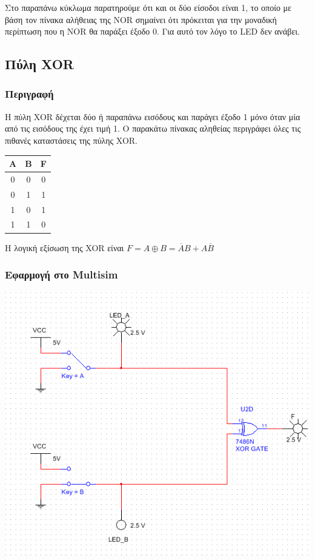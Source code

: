 \documentclass{article}
\begin{document}
Στο παραπάνω κύκλωμα παρατηρούμε ότι και οι δύο είσοδοι είναι 1, το οποίο με βάση
τον πίνακα αλήθειας της NOR σημαίνει ότι πρόκειται για την μοναδική περίπτωση που
η NOR θα παράξει έξοδο 0. Για αυτό τον λόγο το LED δεν ανάβει.

\subsection{Πύλη XOR}
\subsubsection{Περιγραφή}

H πύλη XOR δέχεται δύο ή παραπάνω εισόδους και παράγει έξοδο 1 μόνο όταν μία από τις
εισόδους της έχει τιμή 1. Ο παρακάτω πίνακας αληθείας περιγράφει όλες
τις πιθανές καταστάσεις της πύλης XOR.

\begin{center}
\begin{tabular}{|c|c|c|}
	\hline
	A & B & F \\
	\hline
	0 & 0 & 0 \\
	0 & 1 & 1 \\
	1 & 0 & 1 \\
	1 & 1 & 0 \\
	\hline
\end{tabular}
\end{center}

Η λογική εξίσωση της XOR είναι $F = A \oplus B = \overline{A}B + A\overline{B}$

\subsubsection{Εφαρμογή στο Multisim}
\includegraphics[width=\textwidth]{./res/xor.png}
\end{document}
